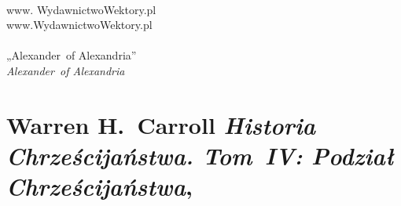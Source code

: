 \documentclass[a4paper,11pt]{article}
\begin{document}
\VerSpaceSix


\noindent
{} \\
\Jest  www. WydawnictwoWektory.pl \\
\Powin www.WydawnictwoWektory.pl \\
 \\
\Jest  „Alexander~of Alexandria” \\
\Powin \textit{Alexander~of Alexandria} \\













\section{ %
  Warren H.~Carroll
  \textit{Historia Chrześcijaństwa. Tom~IV: Podział Chrześcijaństwa},
  \cite{CarrollHistoriaChrzecijanstwaVolIV2011}}






\newpage

\end{document}
